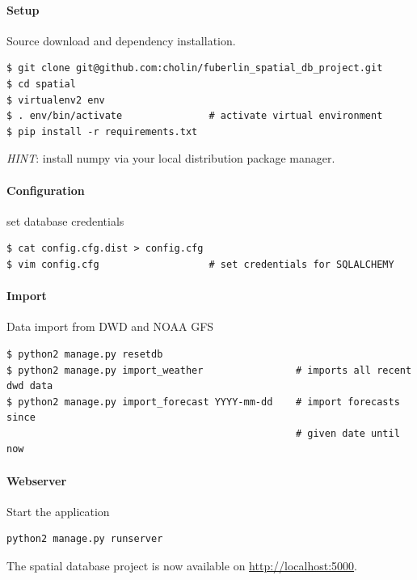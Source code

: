 \documentclass{scrartcl}
\begin{document}
\paragraph{Setup}
Source download and dependency installation.
\begin{verbatim}
$ git clone git@github.com:cholin/fuberlin_spatial_db_project.git
$ cd spatial
$ virtualenv2 env
$ . env/bin/activate               # activate virtual environment
$ pip install -r requirements.txt
\end{verbatim}

\textit{HINT}: install numpy via your local distribution package manager.

\paragraph{Configuration} set database credentials

\begin{verbatim}
$ cat config.cfg.dist > config.cfg
$ vim config.cfg                   # set credentials for SQLALCHEMY
\end{verbatim}

\paragraph{Import}
Data import from DWD and NOAA GFS
\begin{verbatim}
$ python2 manage.py resetdb
$ python2 manage.py import_weather                # imports all recent dwd data
$ python2 manage.py import_forecast YYYY-mm-dd    # import forecasts since
                                                  # given date until now
\end{verbatim}


\paragraph{Webserver}
Start the application
\begin{verbatim}
python2 manage.py runserver
\end{verbatim}

The spatial database project is now available on \url{http://localhost:5000}.

\vspace{1cm}
\end{document}
